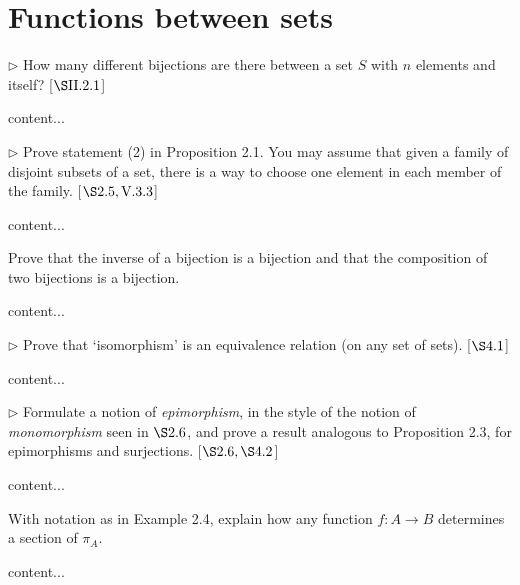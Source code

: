 \section{Functions between sets}
\extitle

\begin{exercise}
	\(\triangleright\) How many different bijections are there between a set \(S\) with \(n\) elements and itself? [\(\S \RN{2}.2.1\)]
\end{exercise}
\begin{solution}
	content...
\end{solution}

\begin{exercise}
	\(\triangleright\) Prove statement (2) in Proposition 2.1. You may assume that given a family of disjoint subsets of a set, there is a way to choose one element in each member of the family. [\(\S 2.5, \RN{5}.3.3\)]
\end{exercise}
\begin{solution}
	content...
\end{solution}

\begin{exercise}
	Prove that the inverse of a bijection is a bijection and that the composition of two bijections is a bijection.
\end{exercise}
\begin{solution}
	content...
\end{solution}

\begin{exercise}
	\(\triangleright\) Prove that ‘isomorphism’ is an equivalence relation (on any set of sets). [\(\S 4.1\)]
\end{exercise}
\begin{solution}
	content...
\end{solution}

\begin{exercise}
	\(\triangleright\) Formulate a notion of \textit{epimorphism}, in the style of the notion of \textit{monomorphism} seen in \(\S 2.6\), and prove a result analogous to Proposition 2.3, for epimorphisms and surjections. [\(\S 2.6, \S 4.2\)]
\end{exercise}
\begin{solution}
	content...
\end{solution}

\begin{exercise}
	With notation as in Example 2.4, explain how any function \(f \colon A \to B\) determines a section of \(\pi_A\).
\end{exercise}
\begin{solution}
	content...
\end{solution}

